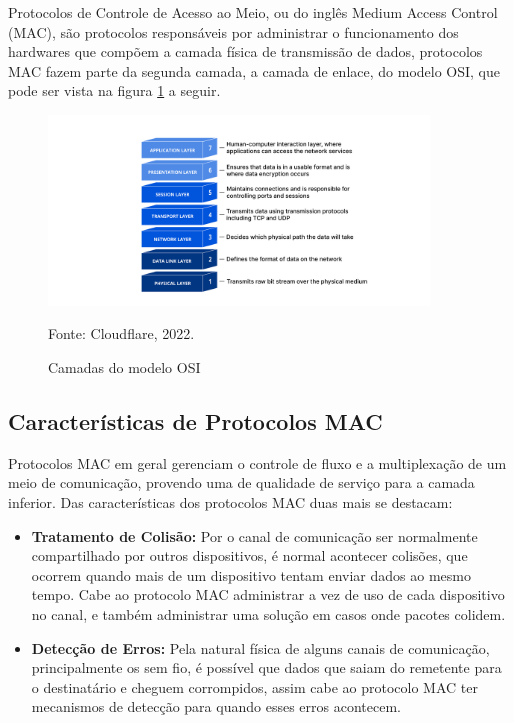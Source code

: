 Protocolos de Controle de Acesso ao Meio, ou do inglês Medium Access Control (MAC), são
protocolos responsáveis por administrar o funcionamento dos hardwares que compõem a camada
física de transmissão de dados, protocolos MAC fazem parte da segunda camada, a camada de
enlace, do modelo OSI, que pode ser vista na figura \ref{fig:osi} a seguir. \cite{5340799}

\begin{figure}[H]
    \centering
	\caption{Camadas do modelo OSI}
    \includegraphics[width=0.9\textwidth]{img/osi-model.png}
    \label{fig:osi}
    
    Fonte: Cloudflare, 2022.
\end{figure}

\subsection{Características de Protocolos MAC}

Protocolos MAC em geral gerenciam o controle de fluxo e a multiplexação de um meio
de comunicação, provendo uma de qualidade de serviço para a camada inferior. Das
características dos protocolos MAC duas mais se destacam: \cite{5340799}

\begin{itemize}
    \item \textbf{Tratamento de Colisão:} Por o canal de comunicação ser normalmente
    compartilhado por outros dispositivos, é normal acontecer colisões, que ocorrem
    quando mais de um dispositivo tentam enviar dados ao mesmo tempo. Cabe ao protocolo
    MAC administrar a vez de uso de cada dispositivo no canal, e também administrar uma
    solução em casos onde pacotes colidem.
    \item \textbf{Detecção de Erros:} Pela natural física de alguns canais de comunicação,
    principalmente os sem fio, é possível que dados que saiam do remetente para o destinatário
    e cheguem corrompidos, assim cabe ao protocolo MAC ter mecanismos de detecção para
    quando esses erros acontecem.
\end{itemize}

